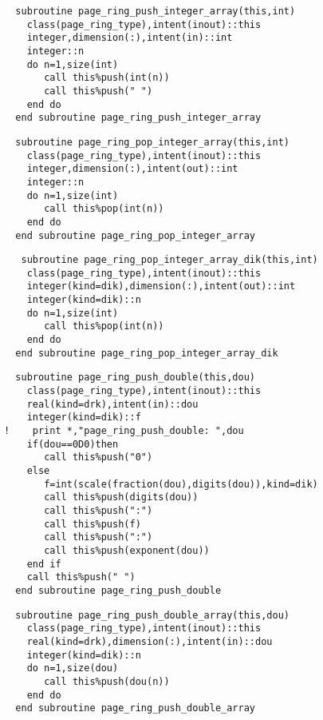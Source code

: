\begin{Verbatim}
  subroutine page_ring_push_integer_array(this,int)
    class(page_ring_type),intent(inout)::this
    integer,dimension(:),intent(in)::int
    integer::n
    do n=1,size(int)
       call this%push(int(n))
       call this%push(" ")
    end do
  end subroutine page_ring_push_integer_array
\end{Verbatim}
  
\begin{Verbatim}
  subroutine page_ring_pop_integer_array(this,int)
    class(page_ring_type),intent(inout)::this
    integer,dimension(:),intent(out)::int
    integer::n
    do n=1,size(int)
       call this%pop(int(n))
    end do
  end subroutine page_ring_pop_integer_array
\end{Verbatim}

\begin{Verbatim}
   subroutine page_ring_pop_integer_array_dik(this,int)
    class(page_ring_type),intent(inout)::this
    integer(kind=dik),dimension(:),intent(out)::int
    integer(kind=dik)::n
    do n=1,size(int)
       call this%pop(int(n))
    end do
  end subroutine page_ring_pop_integer_array_dik
\end{Verbatim}

\begin{Verbatim}
  subroutine page_ring_push_double(this,dou)
    class(page_ring_type),intent(inout)::this
    real(kind=drk),intent(in)::dou
    integer(kind=dik)::f
!    print *,"page_ring_push_double: ",dou
    if(dou==0D0)then
       call this%push("0")
    else
       f=int(scale(fraction(dou),digits(dou)),kind=dik)
       call this%push(digits(dou))
       call this%push(":")    
       call this%push(f)
       call this%push(":")
       call this%push(exponent(dou))
    end if
    call this%push(" ")
  end subroutine page_ring_push_double
\end{Verbatim}

\begin{Verbatim}
  subroutine page_ring_push_double_array(this,dou)
    class(page_ring_type),intent(inout)::this
    real(kind=drk),dimension(:),intent(in)::dou
    integer(kind=dik)::n
    do n=1,size(dou)
       call this%push(dou(n))
    end do
  end subroutine page_ring_push_double_array
\end{Verbatim}

